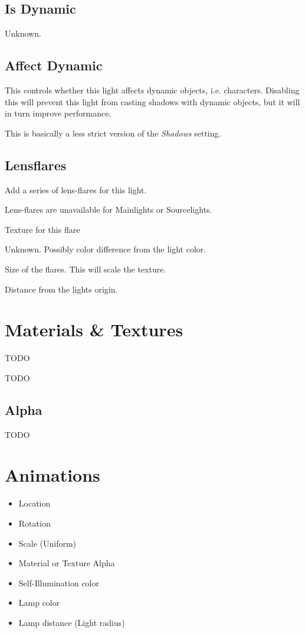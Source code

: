 \subsection*{Is Dynamic}
Unknown.

\subsection*{Affect Dynamic}
This controls whether this light affects dynamic objects, i.e. characters.
Disabling this will prevent this light from casting shadows with dynamic
objects, but it will in turn improve performance.

This is basically a less strict version of the \textit{Shadows} setting.

\subsection*{Lensflares}
Add a series of lens-flares for this light.

Lens-flares are unavailable for Mainlights or Sourcelights.
\begin{description}[leftmargin=6em,style=nextline]
    \item[Texture] Texture for this flare
    \item[Colorshift] Unknown. Possibly color difference from the light color.
    \item[Size] Size of the flares. This will scale the texture.
    \item[Position] Distance from the lights origin.
\end{description}

\section{Materials \& Textures}
\begin{description}[leftmargin=6em,style=nextline]
    \item[Diffuse] TODO
    \item[Specular] TODO
\end{description}

\subsection*{Alpha}
TODO

\section{Animations}

\begin{itemize}
    \item Location
    \item Rotation
    \item Scale (Uniform)
    \item Material or Texture Alpha
    \item Self-Illumination color
    \item Lamp color
    \item Lamp distance (Light radius)
\end{itemize}